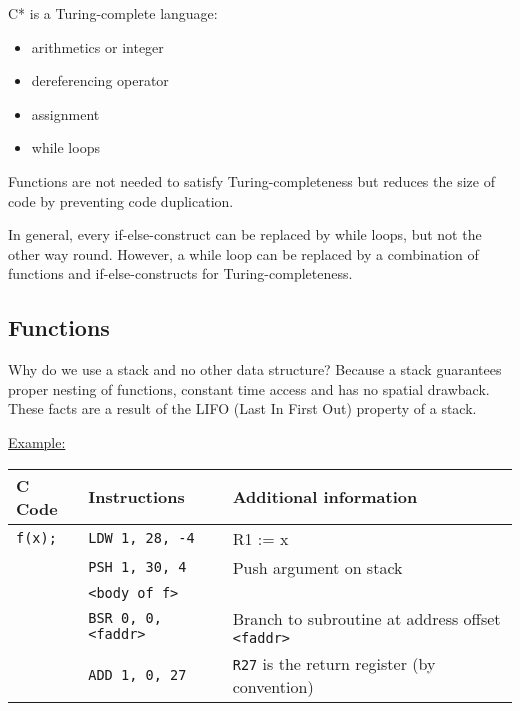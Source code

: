 \par{
	\noindent
	C* is a Turing-complete language:
	\parskip0pt
	\begin{itemize}
		\item{arithmetics or integer}
		\item{dereferencing operator}
		\item{assignment}
		\item{while loops}
	\end{itemize}
	Functions are not needed to satisfy Turing-completeness but reduces the size of code by preventing code duplication.
}

\par{
	\noindent
	In general, every if-else-construct can be replaced by while loops, but not the other way round. However, a while loop can be replaced by a combination of functions and if-else-constructs for Turing-completeness.
}

\subsection*{Functions}

\par{
	\noindent
	Why do we use a stack and no other data structure? Because a stack guarantees proper nesting of functions, constant time access and has no spatial drawback. These facts are a result of the LIFO (Last In First Out) property of a stack.
}

\par{
	\noindent
    \underline{Example:}
    \par{
        \noindent
        \begin{tabular}{lll}
            \hline
            C Code              &   Instructions                &    Additional information                             			\\
            \hline
            \hline
            \rowcolor{blue!25}                
            \texttt{f(x);}		&   \texttt{LDW 1, 28, -4}     	&   R1 := x                               							\\
            \rowcolor{blue!25}
            					&   \texttt{PSH 1, 30, 4}       &   Push argument on stack                                        	\\
            \rowcolor{blue!25}
								&	\texttt{<body of f>}		&																	\\
            \rowcolor{blue!25}
            					&   \texttt{BSR 0, 0, <faddr>}	&   Branch to subroutine at address offset \texttt{<faddr>}   		\\
            \rowcolor{blue!25}
            					&   \texttt{ADD 1, 0, 27}		&   \texttt{R27} is the return register (by convention)		   		\\
            \hline
        \end{tabular}
    }    
}

